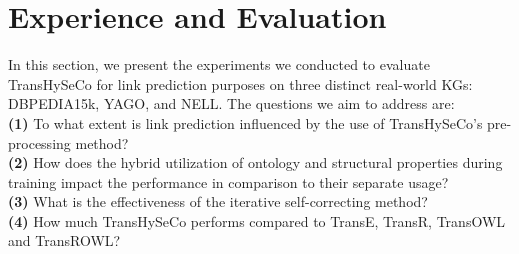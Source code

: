 \documentclass[sigconf]{acmart}
\newcommand{\TransHI}{TransHySeCo\xspace}
\begin{document}
\section{Experience and Evaluation}
\label{sect:evaluation}
In this section, we present the experiments we conducted to evaluate \TransHI for link prediction purposes on three distinct real-world KGs:  DBPEDIA15k\cite{dbpedia}, YAGO\cite{YAGO}, and NELL\cite{nell}. 
The questions we aim to address are:\\
\textbf{(1)} To what extent is link prediction influenced by the use of \TransHI's pre-processing method?\\
\textbf{(2)} How does the hybrid utilization of ontology and structural properties during training impact the performance in comparison to their separate usage?\\
\textbf{(3)}  What is the effectiveness of the  iterative self-correcting method?\\
\textbf{(4)}  How much  \TransHI performs compared to TransE, TransR, TransOWL and TransROWL?\\
\end{document}
